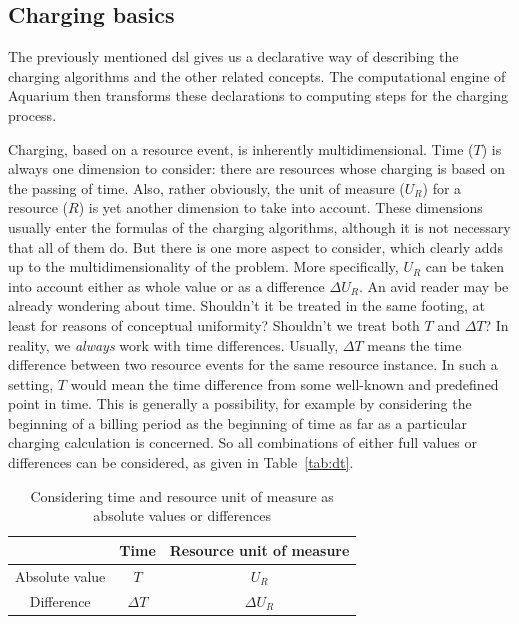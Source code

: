 \documentclass[preprint,10pt]{sigplanconf}
\newcommand{\DTime}{\ensuremath{T}\xspace} %
\newcommand{\DeltaDTime}{\ensuremath{\Delta{T}}\xspace}
\newcommand{\DUnitR}{\ensuremath{U_{R}}\xspace} %
\newcommand{\DeltaDUnitR}{\ensuremath{\Delta U_{R}}\xspace}
\begin{document}
\subsection{Charging basics}
The previously mentioned {\sc dsl} gives us a declarative way of describing the charging algorithms and the other related concepts. The computational engine of Aquarium then transforms these declarations to computing steps for the charging process.

Charging, based on a resource event, is inherently multidimensional. Time (\DTime) is always one dimension to consider: there are resources whose charging is based on the passing of time. Also, rather obviously, the unit of measure (\DUnitR) for a resource ($R$) is yet another dimension to take into account. These dimensions usually enter the formulas of the charging algorithms, although it is not necessary that all of them do. But there is one more aspect to consider, which clearly adds up to the multidimensionality of the problem. More specifically, \DUnitR can be taken into account either as whole value or as a difference \DeltaDUnitR. An avid reader may be already wondering about time. Shouldn't it be treated in the same footing, at least for reasons of conceptual uniformity? Shouldn't we treat both \DTime and \DeltaDTime? In reality, we \textit{always} work with time differences. Usually, \DeltaDTime means the time difference between two resource events for the same resource instance. In such a setting, \DTime would mean the time difference from some well-known and predefined point in time. This is generally a possibility, for example by considering the beginning of a billing period as the beginning of time as far as a particular charging calculation is concerned. So all combinations of either full values or differences can be considered, as given in Table~\ref{tab:dt}.

\begin{table}[htdp]
\label{tab:dt}
\begin{center}
\begin{tabular}{|c|c|c|}
\hline
&Time & Resource unit of measure \\
\hline
Absolute value & \DTime & \DUnitR \\
Difference & \DeltaDTime  & \DeltaDUnitR \\
\hline
\end{tabular}
\end{center}
\label{default}
\caption{Considering time and resource unit of measure as absolute values or differences
}
\end{table}%
\end{document}
